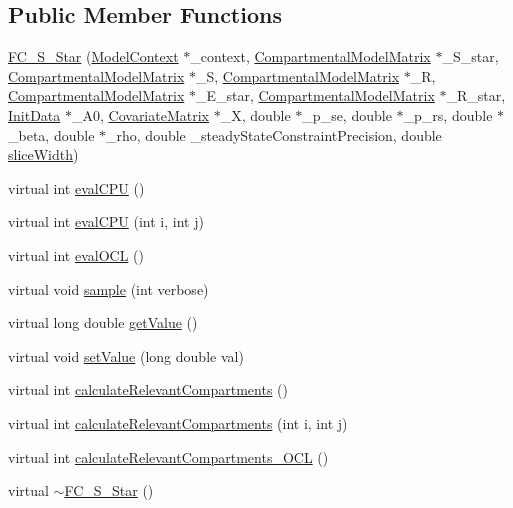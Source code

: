 \subsection*{Public Member Functions}
\begin{DoxyCompactItemize}
\item 
\hyperlink{classSpatialSEIR_1_1FC__S__Star_a080c77a634e28265cbc33e08ad2ea8d9}{F\-C\-\_\-\-S\-\_\-\-Star} (\hyperlink{classSpatialSEIR_1_1ModelContext}{Model\-Context} $\ast$\-\_\-context, \hyperlink{classSpatialSEIR_1_1CompartmentalModelMatrix}{Compartmental\-Model\-Matrix} $\ast$\-\_\-\-S\-\_\-star, \hyperlink{classSpatialSEIR_1_1CompartmentalModelMatrix}{Compartmental\-Model\-Matrix} $\ast$\-\_\-\-S, \hyperlink{classSpatialSEIR_1_1CompartmentalModelMatrix}{Compartmental\-Model\-Matrix} $\ast$\-\_\-\-R, \hyperlink{classSpatialSEIR_1_1CompartmentalModelMatrix}{Compartmental\-Model\-Matrix} $\ast$\-\_\-\-E\-\_\-star, \hyperlink{classSpatialSEIR_1_1CompartmentalModelMatrix}{Compartmental\-Model\-Matrix} $\ast$\-\_\-\-R\-\_\-star, \hyperlink{classSpatialSEIR_1_1InitData}{Init\-Data} $\ast$\-\_\-\-A0, \hyperlink{classSpatialSEIR_1_1CovariateMatrix}{Covariate\-Matrix} $\ast$\-\_\-\-X, double $\ast$\-\_\-p\-\_\-se, double $\ast$\-\_\-p\-\_\-rs, double $\ast$\-\_\-beta, double $\ast$\-\_\-rho, double \-\_\-steady\-State\-Constraint\-Precision, double \hyperlink{classSpatialSEIR_1_1FullConditional_a150ee031af8d086ad0a04b13630a110f}{slice\-Width})
\item 
virtual int \hyperlink{classSpatialSEIR_1_1FC__S__Star_a85f440e1a945be994cbbdcbafca9d125}{eval\-C\-P\-U} ()
\item 
virtual int \hyperlink{classSpatialSEIR_1_1FC__S__Star_aaa438f0eae4ff7ac24721a5e4eb67ac3}{eval\-C\-P\-U} (int i, int j)
\item 
virtual int \hyperlink{classSpatialSEIR_1_1FC__S__Star_a36db3b203873bca03bbd5d6d52fc55d5}{eval\-O\-C\-L} ()
\item 
virtual void \hyperlink{classSpatialSEIR_1_1FC__S__Star_acf2c800d9bed70b302b8ec7c1dd9358f}{sample} (int verbose)
\item 
virtual long double \hyperlink{classSpatialSEIR_1_1FC__S__Star_a3dd725f1ab193c0b0774c498be092344}{get\-Value} ()
\item 
virtual void \hyperlink{classSpatialSEIR_1_1FC__S__Star_a1d86c5a35b1e626124b05aafdd5b87fa}{set\-Value} (long double val)
\item 
virtual int \hyperlink{classSpatialSEIR_1_1FC__S__Star_a0059f6af650ff4d0e5bfc17a3a4a6f0c}{calculate\-Relevant\-Compartments} ()
\item 
virtual int \hyperlink{classSpatialSEIR_1_1FC__S__Star_a2caf261df37f0b20d2ded6630332886c}{calculate\-Relevant\-Compartments} (int i, int j)
\item 
virtual int \hyperlink{classSpatialSEIR_1_1FC__S__Star_aca332563eafecfb7f7d85b61c87ceb15}{calculate\-Relevant\-Compartments\-\_\-\-O\-C\-L} ()
\item 
virtual \hyperlink{classSpatialSEIR_1_1FC__S__Star_ab48460dbce4e3e9eb35233f3a1ea8313}{$\sim$\-F\-C\-\_\-\-S\-\_\-\-Star} ()
\end{DoxyCompactItemize}
